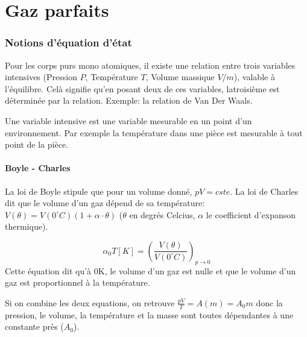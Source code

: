 

\usepackage[hideerrors]{xcolor}
\usepackage{array}
\usepackage{amsmath}
\usepackage{amssymb}
\usepackage{amsthm}
\usepackage{fancybox}
\usepackage{float}
\usepackage{colortbl}
\usepackage{graphicx}

\DeclareMathOperator{\Sur}{Sur}
\DeclareMathOperator{\In}{In}
\DeclareMathOperator{\newnull}{null}
\DeclareMathOperator{\newim}{Im}
\DeclareMathOperator{\newker}{Ker}
\DeclareMathOperator{\cof}{cof}
\DeclareMathOperator{\rang}{rang}




\part{Gaz parfaits}
\section{Notions d'équation d'état}
Pour les corps purs mono atomiques, il existe une relation entre trois variables intensives (Pression $P$, Température $T$, Volume massique $V/m$), valable à l'équilibre. Celà signifie qu'en posant deux de ces variables, latroisième est déterminée par la relation.
Exemple: la relation de Van Der Waals.

Une variable intensive est une variable mesurable en un point d'un environnement. Par exemple la température dans une pièce est mesurable à tout point de la pièce.

\subsection{Boyle - Charles}
La loi de Boyle stipule que pour un volume donné, $pV = cste$.
La loi de Charles dit que le volume d'un gaz dépend de sa température: $V(\theta) = V(0^\circ C)(1 + \alpha \cdot \theta)$ ($\theta$ en degrés Celcius, $\alpha$ le coefficient d'expanson thermique).

$$\alpha_0 T[K] = (\frac{V(\theta)}{V(0^\circ C)})_{p \rightarrow 0}$$
Cette équation dit qu'à 0K, le volume d'un gaz est nulle et que le volume d'un gaz est proportionnel à la température.

Si on combine les deux equations, on retrouve $\frac{pV}{T} = A(m) = A_0 m$ donc la pression, le volume, la température et la masse sont toutes dépendantes à une constante près ($A_0$).

